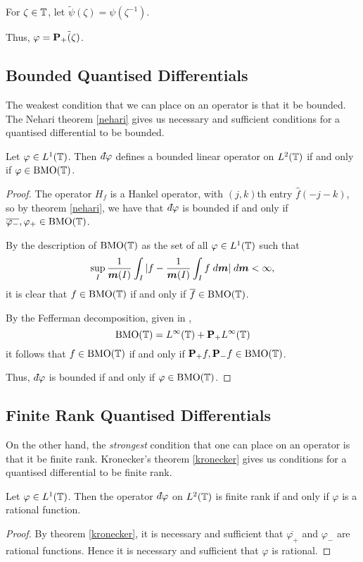 For $\zeta \in \mathbb{T}$, let $\tilde{\psi}(\zeta) = \psi(\zeta^{-1})$. 

Thus, $\varphi = \mathbf{P}_+\tilde(\zeta)$.

\subsection{Bounded Quantised Differentials}
The weakest condition that we can place on an operator is that it be bounded.
The Nehari theorem \ref{nehari} gives us necessary and sufficient conditions
for a quantised differential to be bounded.
\begin{proposition}
    \label{boundedDifferentials}
    Let $\varphi \in L^1(\mathbb{T})$. Then $\qd \varphi$ defines a bounded
    linear operator on $L^2(\mathbb{T})$ if and only if $\varphi \in \operatorname{BMO}(\mathbb{T})$.
\end{proposition}
\begin{proof}
    The operator $H_{f}$ is a Hankel operator, with $(j,k)$th entry $\hat{f}(-j-k)$,
    so by theorem \ref{nehari}, we have that $\qd \varphi$ is bounded
    if and only if $\overline{\varphi_-},\varphi_+ \in \operatorname{BMO}(\mathbb{T})$. 
    
    By the description of $\operatorname{BMO}(\mathbb{T})$ as the set of all $\varphi \in L^1(\mathbb{T})$
    such that
    \begin{equation}
        \sup_{I} \frac{1}{\boldsymbol{m}(I)} \int_{I} |f-\frac{1}{\boldsymbol{m}(I)}\int_I f\;d\boldsymbol{m}| \;d\boldsymbol{m} < \infty,
    \end{equation}
    it is clear that $f \in \operatorname{BMO}(\mathbb{T})$ if and only if $\overline{f} \in \operatorname{BMO}(\mathbb{T})$.
    
    By the Fefferman decomposition, given in \cite{Garnett},
    \begin{equation}
        \operatorname{BMO}(\mathbb{T}) = L^\infty(\mathbb{T})+\mathbf{P}_+L^\infty(\mathbb{T})
    \end{equation}
    it follows that $f \in \operatorname{BMO}(\mathbb{T})$ if and only if $\mathbf{P}_+f,\mathbf{P}_-f \in \operatorname{BMO}(\mathbb{T})$.
    
    Thus, $\qd \varphi$ is bounded if and only if $\varphi \in \operatorname{BMO}(\mathbb{T})$.
\end{proof}



\subsection{Finite Rank Quantised Differentials}
On the other hand, the \emph{strongest} condition that one
can place on an operator is that it be finite rank. Kronecker's theorem \ref{kronecker}
gives us conditions for a quantised differential to be finite rank.
\begin{proposition}
    Let $\varphi \in L^1(\mathbb{T})$. Then the operator $\qd \varphi$
    on $L^2(\mathbb{T})$ is finite rank if and only if $\varphi$
    is a rational function.
\end{proposition}
\begin{proof}
    By theorem \ref{kronecker}, it is necessary and sufficient
    that $\overline{\varphi_+}$ and $\varphi_-$ are rational
    functions. Hence it is necessary and sufficient that $\varphi$
    is rational.
\end{proof}

